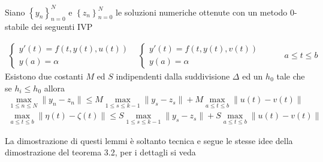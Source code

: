 \begin{lemma}
 Siano $\left \{ y_n \right \}_{n=0}^N$ e $\left \{ z_n \right \}_{n=0}^N$ le soluzioni numeriche ottenute 
 con un metodo $0$-stabile dei seguenti IVP

$$
\begin{array}{cc}
 \begin{cases}
    y'(t)=f(t,y(t),u(t))	\\
    y(a)=\alpha
 \end{cases}
&
 \begin{cases}
    y'(t)=f(t,y(t),v(t))	\\
    y(a)=\alpha
 \end{cases}
\end{array}
\hspace{1cm}
a \le t \le b
$$
Esistono due costanti $M$ ed $S$  indipendenti dalla suddivisione $\Delta$ ed un $h_0$ tale che se $h_i \le h_0$ allora
\renewcommand\arraystretch{1,5}
$$
\begin{array}{lc}
\displaystyle
 \max_{1 \le n \le N} \| y_n - z_n \| \le M \max_{1 \le s \le k-1} \| y_s - z_s \| + M \max_{a \le t \le b} \| u(t)-v(t) \|	\\
\displaystyle
 \max_{a \le t \le b} \| \eta(t) - \zeta(t) \| \le S \max_{1 \le s \le k-1} \| y_s - z_s \| + S \max_{a \le t \le b} \| u(t)-v(t) \|
\end{array}
$$
\renewcommand\arraystretch{1}
\end{lemma}

La dimostrazione di questi lemmi è soltanto tecnica e segue le stesse idee della dimostrazione del teorema 3.2, per 
i dettagli si veda \cite[lemmi 4.1.3 e 4.1.4]{2}

